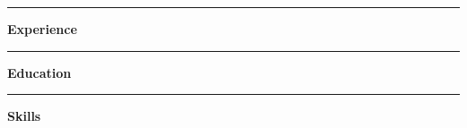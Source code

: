 \documentclass[10pt]{article}
\newcommand{\resumesection}[1] {
    \vspace{20pt}
    \noindent
    \textcolor{MidnightBlue!50!White}{\rule{.5in}{9pt}} \textbf{\Large{#1}} \newline
}
\begin{document}
    \resumesection{Experience}

    \resumesection{Education}

    \resumesection{Skills}
\end{document}
